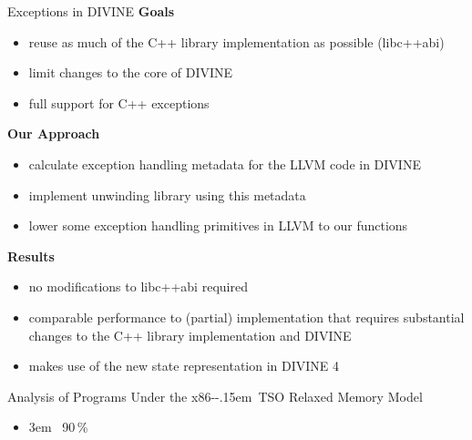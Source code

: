 \documentclass[aspectratio=169, fi]{paradise-slide}
\newcommand{\fcite}[1]{\emergencystretch 3em{\protect\NoHyper\cite{#1}}~\fullcite{#1}}
\newcommand{\xtso}{\mbox{x86-\kern-.15em TSO}\xspace}
\newenvironment{prespart}[1]{%
  \begin{frame}{}%
    \centering
      {\Large #1} \par\bigskip\bigskip%
}{%
  \end{frame}%
}
\begin{document}
\begin{frame}{Exceptions in DIVINE}
  \textbf{Goals}
  \begin{itemize}
    \item reuse as much of the C++ library implementation as possible (libc++abi)
    \item limit changes to the core of DIVINE
    \item full support for C++ exceptions
  \end{itemize}
  \pause

  \bigskip
  \textbf{Our Approach}
  \begin{itemize}
    \item calculate exception handling metadata for the LLVM code in DIVINE
    \item implement unwinding library using this metadata
    \item lower some exception handling primitives in LLVM to our functions
  \end{itemize}
  \pause

  \bigskip
  \textbf{Results}
  \begin{itemize}
    \item no modifications to libc++abi required
    \item comparable performance to (partial) implementation that requires substantial changes to
      the C++ library implementation and DIVINE
    \item makes use of the new state representation in DIVINE 4
  \end{itemize}
\end{frame}

\begin{prespart}{Analysis of Programs Under the \xtso Relaxed Memory Model}
  \begin{itemize}
    \item \fcite{SB2018x86tso} \hfill 90\,\%
  \end{itemize}
\end{prespart}
\end{document}
